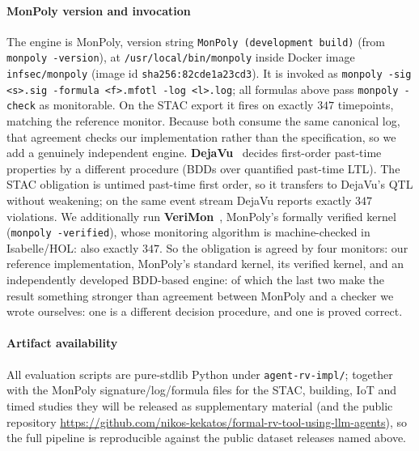 \documentclass[sigconf]{acmart}
\begin{document}
\paragraph{MonPoly version and invocation} The engine is MonPoly, version string
\texttt{MonPoly (development build)} (from \texttt{monpoly -version}), at
\texttt{/usr/local/bin/monpoly} inside Docker image \texttt{infsec/monpoly}
(image id \texttt{sha256:82cde1a2\allowbreak3cd3}). It is invoked as
\texttt{monpoly -sig <s>.sig -formula <f>.mfotl -log <l>.log}; all formulas above pass
\texttt{monpoly -check} as monitorable. On the STAC export it fires on exactly $347$
timepoints, matching the reference monitor. Because both consume the same canonical log,
that agreement checks our implementation rather than the specification, so we add a
genuinely independent engine. \textbf{DejaVu}~\cite{havelund2018dejavu} decides
first-order past-time properties by a different procedure (BDDs over quantified
past-time LTL). The STAC obligation is untimed past-time first order, so it transfers to
DejaVu's QTL without weakening; on the same event stream DejaVu reports exactly $347$
violations. We additionally run \textbf{VeriMon}~\cite{verimon2022}, MonPoly's formally
verified kernel (\texttt{monpoly -verified}), whose monitoring algorithm is
machine-checked in Isabelle/HOL: also exactly $347$. So the obligation is agreed by four
monitors: our reference implementation, MonPoly's standard kernel, its verified
kernel, and an independently developed BDD-based engine: of which the last two make
the result something stronger than agreement between MonPoly and a checker we wrote
ourselves: one is a different decision procedure, and one is proved correct.

\paragraph{Artifact availability} All evaluation scripts are pure-stdlib Python under
\texttt{agent-rv-impl/}; together with the MonPoly signature/log/formula files for the
STAC, building, IoT and timed studies they will be released as supplementary material
(and the public repository
\url{https://github.com/nikos-kekatos/formal-rv-tool-using-llm-agents}), so the full
pipeline is
reproducible against the public dataset releases named above.
\end{document}

